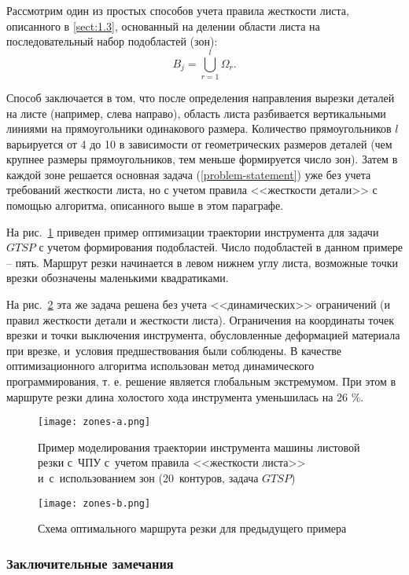 Рассмотрим один из простых способов учета правила жесткости листа,
описанного в \ref{sect:1.3},
основанный на делении области листа на
последовательный набор подобластей (зон):
$$
  B_j =
  \bigcup_{r=1}^l \Omega_r
  .
$$

Способ заключается в том,
что после определения направления вырезки деталей на листе
(например, слева направо),
область листа разбивается вертикальными линиями
на прямоугольники одинакового размера.
Количество прямоугольников $l$
варьируется от 4 до 10 в зависимости от
геометрических размеров деталей
(чем крупнее размеры прямоугольников,
тем меньше формируется число зон).
Затем в каждой зоне решается основная задача
(\ref{problem-statement})
уже без учета требований жесткости листа,
но с учетом правила <<жесткости детали>>
с помощью  алгоритма, описанного выше в этом параграфе.

На рис.~\ref{zones-a}
приведен пример оптимизации траектории
инструмента для задачи $GTSP$ с учетом
формирования подобластей.
Число подобластей в данном примере -- пять.
Маршрут резки начинается в левом нижнем углу листа,
возможные точки врезки обозначены маленькими квадратиками.

На рис.~\ref{zones-b}
эта же задача решена без учета
<<динамических>> ограничений
(и правил жесткости детали и жесткости листа).
Ограничения на координаты точек врезки и
точки выключения инструмента,
обусловленные деформацией материала при врезке,
и~условия предшествования были соблюдены.
В качестве оптимизационного алгоритма
использован метод динамического программирования,
т. е. решение является глобальным экстремумом.
При этом в маршруте резки
длина холостого хода инструмента уменьшилась на 26 \%.

\begin{figure}[H]
  \centering
  \texttt{[image: zones-a.png]}
  \caption{
    Пример моделирования траектории инструмента машины листовой резки с~ЧПУ
    с~учетом правила <<жесткости листа>>
    и~с~использованием зон
    (20~контуров, задача $GTSP$)
    }
  \label{zones-a}
\end{figure}

\begin{figure}[H]
  \centering
  \texttt{[image: zones-b.png]}
  \caption{
    Схема оптимального маршрута резки для предыдущего примера
  }
  \label{zones-b}
\end{figure}

\subsubsection*{
  Заключительные замечания
}

